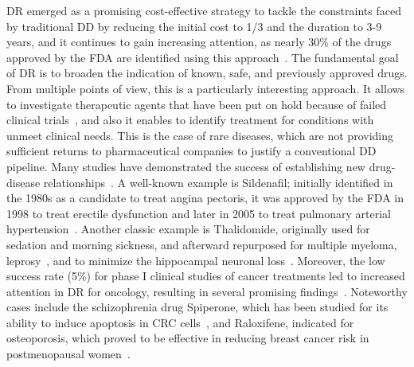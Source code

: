 \gls{DR} emerged as a promising cost-effective strategy to tackle the constraints faced by traditional \gls{DD} by reducing the initial cost to 1/3 and the duration to 3-9 years, and it continues to gain increasing attention, as nearly 30\% of the drugs approved by the \gls{FDA} are identified using this approach~\cite{RN54,RN64}. 
The fundamental goal of \gls{DR} is to broaden the indication of known, safe, and previously approved drugs. 
From multiple points of view, this is a particularly interesting approach. 
It allows to investigate therapeutic agents that have been put on hold because of failed clinical trials~\cite{RN62}, and also it enables to identify treatment for conditions with unmeet clinical needs. 
This is the case of rare diseases, which are not providing sufficient returns to pharmaceutical companies to justify a conventional \gls{DD} pipeline. 
Many studies have demonstrated the success of establishing new drug-disease relationships~\cite{RN48}. 
A well-known example is Sildenafil; initially identified in the 1980s as a candidate to treat angina pectoris, it was approved by the \gls{FDA} in 1998 to treat erectile dysfunction and later in 2005 to treat pulmonary arterial hypertension~\cite{RN54, RN64, RN94}. 
Another classic example is Thalidomide, originally used for sedation and morning sickness, and afterward repurposed for multiple myeloma, leprosy~\cite{RN54, RN64}, and to minimize the hippocampal neuronal loss~\cite{RN50}. Moreover, the low success rate (5\%) for phase I clinical studies of cancer treatments led to increased attention in \gls{DR} for oncology, resulting in several promising findings~\cite{RN64, RN63}. 
Noteworthy cases include the schizophrenia drug Spiperone, which has been studied for its ability to induce apoptosis in \gls{CRC} cells~\cite{RN51}, and Raloxifene, indicated for osteoporosis, which proved to be effective in reducing breast cancer risk in postmenopausal women~\cite{RN64, RN61}.

